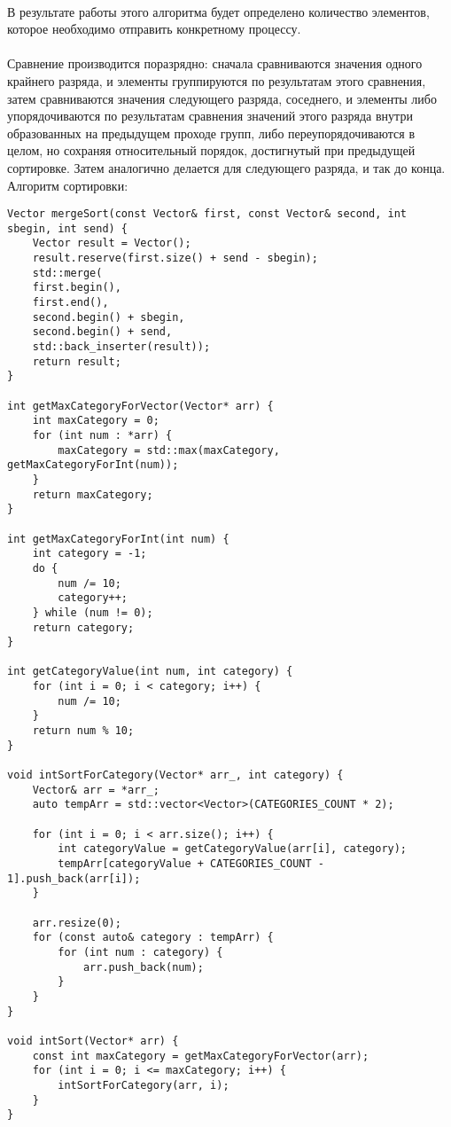 \documentclass[12pt,a4paper]{article}
\begin{document}
\paragraph{}В результате работы этого алгоритма будет определено количество элементов, которое необходимо отправить конкретному процессу.

\paragraph{}
Сравнение производится поразрядно: сначала сравниваются значения одного крайнего разряда, и элементы группируются по результатам этого сравнения, затем сравниваются значения следующего разряда, соседнего, и элементы либо упорядочиваются по результатам сравнения значений этого разряда внутри образованных на предыдущем проходе групп, либо переупорядочиваются в целом, но сохраняя относительный порядок, достигнутый при предыдущей сортировке. Затем аналогично делается для следующего разряда, и так до конца. Алгоритм сортировки: 
\begin{lstlisting}
Vector mergeSort(const Vector& first, const Vector& second, int sbegin, int send) {
	Vector result = Vector();
	result.reserve(first.size() + send - sbegin);
	std::merge(
	first.begin(),
	first.end(),
	second.begin() + sbegin,
	second.begin() + send,
	std::back_inserter(result));
	return result;
}

int getMaxCategoryForVector(Vector* arr) {
	int maxCategory = 0;
	for (int num : *arr) {
		maxCategory = std::max(maxCategory, getMaxCategoryForInt(num));
	}
	return maxCategory;
}

int getMaxCategoryForInt(int num) {
	int category = -1;
	do {
		num /= 10;
		category++;
	} while (num != 0);
	return category;
}

int getCategoryValue(int num, int category) {
	for (int i = 0; i < category; i++) {
		num /= 10;
	}
	return num % 10;
}

void intSortForCategory(Vector* arr_, int category) {
	Vector& arr = *arr_;
	auto tempArr = std::vector<Vector>(CATEGORIES_COUNT * 2);
	
	for (int i = 0; i < arr.size(); i++) {
		int categoryValue = getCategoryValue(arr[i], category);
		tempArr[categoryValue + CATEGORIES_COUNT - 1].push_back(arr[i]);
	}
	
	arr.resize(0);
	for (const auto& category : tempArr) {
		for (int num : category) {
			arr.push_back(num);
		}
	}
}

void intSort(Vector* arr) {
	const int maxCategory = getMaxCategoryForVector(arr);
	for (int i = 0; i <= maxCategory; i++) {
		intSortForCategory(arr, i);
	}
}
\end{lstlisting}
\end{document}
